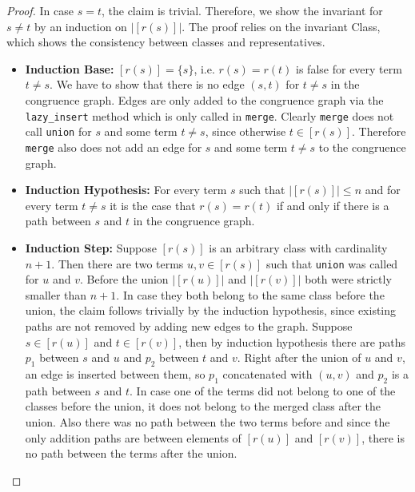 \begin{proof}

In case $s = t$, the claim is trivial.
Therefore, we show the invariant for $s \neq t$ by an induction on $|[r(s)]|$.
The proof relies on the invariant Class, which shows the consistency between classes and representatives.

\begin{itemize}
\item \textbf{Induction Base:} $[r(s)] = \{s\}$, i.e. $r(s) = r(t)$ is false for every term $t \neq s$.
We have to show that there is no edge $(s,t)$ for $t \neq s$ in the congruence graph.
Edges are only added to the congruence graph via the \texttt{lazy\_insert} method which is only called in \texttt{merge}.
Clearly \texttt{merge} does not call \texttt{union} for $s$ and some term $t \neq s$, since otherwise $t \in [r(s)]$.
Therefore \texttt{merge} also does not add an edge for $s$ and some term $t \neq s$ to the congruence graph.

\item \textbf{Induction Hypothesis:} For every term $s$ such that $|[r(s)]| \leq n$ and for every term $t \neq s$ it is the case that $r(s) = r(t)$ if and only if there is a path between $s$ and $t$ in the congruence graph.

\item \textbf{Induction Step:} Suppose $[r(s)]$ is an arbitrary class with cardinality $n+1$.
Then there are two terms $u,v \in [r(s)]$ such that \texttt{union} was called for $u$ and $v$.
Before the union $|[r(u)]|$ and $|[r(v)]|$ both were strictly smaller than $n+1$.
In case they both belong to the same class before the union, the claim follows trivially by the induction hypothesis, since existing paths are not removed by adding new edges to the graph.
Suppose $s \in [r(u)]$ and $t \in [r(v)]$, then by induction hypothesis there are paths $p_1$ between $s$ and $u$ and $p_2$ between $t$ and $v$.
Right after the union of $u$ and $v$, an edge is inserted between them, so $p_1$ concatenated with $(u,v)$ and $p_2$ is a path between $s$ and $t$.
In case one of the terms did not belong to one of the classes before the union, it does not belong to the merged class after the union.
Also there was no path between the two terms before and since the only addition paths are between elements of $[r(u)]$ and $[r(v)]$, there is no path between the terms after the union.
\end{itemize}

\end{proof}

